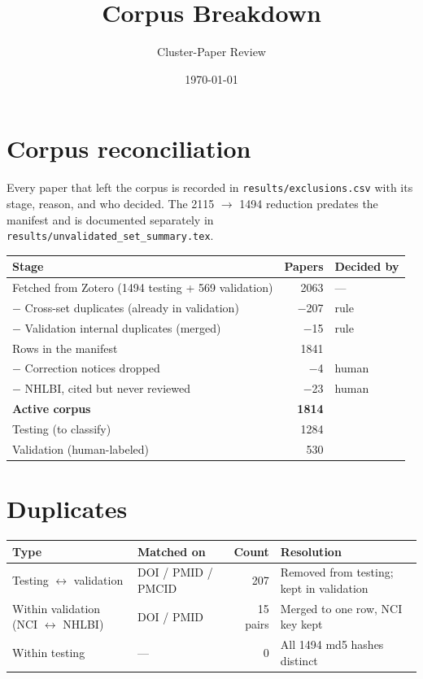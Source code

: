 \documentclass[11pt]{article}
\title{Corpus Breakdown}
\author{Cluster-Paper Review}
\date{\today}
\begin{document}
\maketitle
\vspace{-2em}

\section{Corpus reconciliation}

Every paper that left the corpus is recorded in \texttt{results/exclusions.csv} with its stage, reason,
and who decided. The 2115 $\rightarrow$ 1494 reduction predates the manifest and is documented separately
in \texttt{results/unvalidated\_set\_summary.tex}.

\begin{table}[h]
\centering
\begin{tabular}{lrl}
\toprule
\textbf{Stage} & \textbf{Papers} & \textbf{Decided by} \\
\midrule
Fetched from Zotero (1494 testing + 569 validation) & 2063 & --- \\
\quad $-$ Cross-set duplicates (already in validation) & $-$207 & rule \\
\quad $-$ Validation internal duplicates (merged) & $-$15 & rule \\
\midrule
Rows in the manifest & 1841 & \\
\quad $-$ Correction notices dropped & $-$4 & human \\
\quad $-$ NHLBI, cited but never reviewed & $-$23 & human \\
\midrule
\textbf{Active corpus} & \textbf{1814} & \\
\quad Testing (to classify) & 1284 & \\
\quad Validation (human-labeled) & 530 & \\
\bottomrule
\end{tabular}
\end{table}

\section{Duplicates}

\begin{table}[h]
\centering
\begin{tabular}{llrl}
\toprule
\textbf{Type} & \textbf{Matched on} & \textbf{Count} & \textbf{Resolution} \\
\midrule
Testing $\leftrightarrow$ validation & DOI / PMID / PMCID & 207 & Removed from testing; kept in validation \\
Within validation (NCI $\leftrightarrow$ NHLBI) & DOI / PMID & 15 pairs & Merged to one row, NCI key kept \\
Within testing & --- & 0 & All 1494 md5 hashes distinct \\
\bottomrule
\end{tabular}
\end{table}
\end{document}
